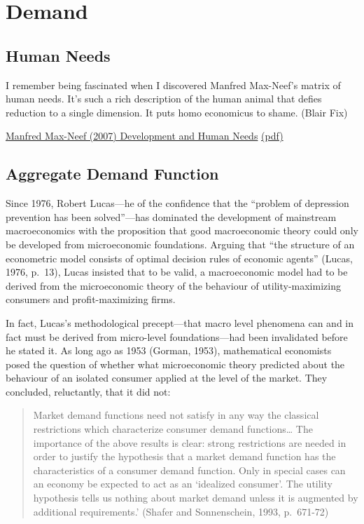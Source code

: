 \documentclass[
]{book}
\begin{document}
\hypertarget{demand}{%
\chapter{Demand}\label{demand}}

\hypertarget{human-needs}{%
\section{Human Needs}\label{human-needs}}

I remember being fascinated when I discovered Manfred Max-Neef's matrix of human needs. It's such a rich description of the human animal that defies reduction to a single dimension. It puts homo economicus to shame. (Blair Fix)

\href{https://t.co/OIXQbLvM0z?amp=1}{Manfred Max-Neef (2007) Development and Human Needs}
\href{pdf/Manfred_Max-Neef_2007_Fundamental_Human_Needs.pdf}{(pdf)}

\hypertarget{aggregate-demand-function}{%
\section{Aggregate Demand Function}\label{aggregate-demand-function}}

Since 1976, Robert Lucas---he of the confidence that the ``problem of depression prevention has been solved''---has dominated the development of mainstream macroeconomics with the proposition that good macroeconomic theory could only be developed from microeconomic foundations. Arguing that ``the structure of an econometric model consists of optimal decision rules of economic agents'' (Lucas, 1976, p.~13), Lucas insisted that to be valid, a macroeconomic model had to be derived from the microeconomic theory of the behaviour of utility-maximizing consumers and profit-maximizing firms.

In fact, Lucas's methodological precept---that macro level phenomena can and in fact must be derived from micro-level foundations---had been invalidated before he stated it. As long ago as 1953 (Gorman, 1953), mathematical economists posed the question of whether what microeconomic theory predicted about the behaviour of an isolated consumer applied at the level of the market. They concluded, reluctantly, that it did not:

\begin{quote}
Market demand functions need not satisfy in any way the classical restrictions which characterize consumer demand functions\ldots{} The importance of the above results is clear: strong restrictions are needed in order to justify the hypothesis that a market demand function has the characteristics of a consumer demand function. Only in special cases can an economy be expected to act as an `idealized consumer'. The utility hypothesis tells us nothing about market demand unless it is augmented by additional requirements.' (Shafer and Sonnenschein, 1993, p.~671-72)
\end{quote}
\end{document}
